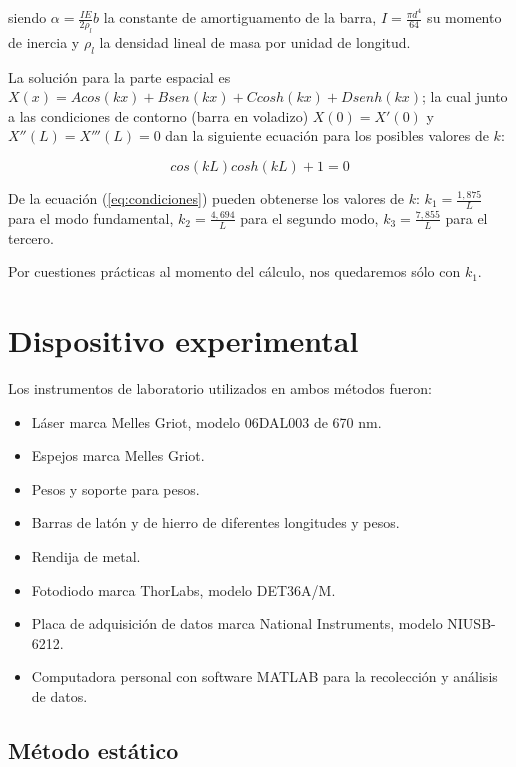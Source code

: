 \documentclass[twoside,twocolumn,a4paper]{article}
\begin{document}
siendo $\alpha = \frac{IE}{2\rho_{l}}b$ la constante de amortiguamento de la barra, $I = \frac{\pi d^4}{64}$ su momento de inercia y $\rho_{l}$ la densidad lineal de masa por unidad de longitud. \newline

La soluci\'on para la parte espacial es $X(x) = Acos(kx) + Bsen(kx) + Ccosh(kx) + Dsenh(kx)$; la cual junto a las condiciones de contorno (barra en voladizo) $X(0) = X'(0)$ y $X''(L) = X'''(L) = 0$ dan la siguiente ecuaci\'on para los posibles valores de $k$:

\begin{equation}
\label{eq:condiciones}
cos(kL)cosh(kL) + 1 = 0
\end{equation}

De la ecuaci\'on (\ref{eq:condiciones}) pueden obtenerse los valores de $k$:  $k_{1} = \frac{1,875}{L}$ para el modo fundamental, $k_{2} = \frac{4,694}{L}$ para el segundo modo, $k_{3} = \frac{7,855}{L}$ para el tercero.

Por cuestiones pr\'acticas al momento del c\'alculo, nos quedaremos s\'olo con $k_{1}$.



\section{Dispositivo experimental}

Los instrumentos de laboratorio utilizados en ambos m\'etodos fueron:
\begin{itemize}
\item 
\label{Laser} L\'aser marca Melles Griot, modelo 06DAL003 de 670 nm.
\item Espejos marca Melles Griot.
\item Pesos y soporte para pesos.
\item Barras de lat\'on y de hierro de diferentes longitudes y pesos.
\item Rendija de metal.
\item Fotodiodo marca ThorLabs, modelo DET36A/M.
\item Placa de adquisici\'on de datos marca National Instruments, modelo NIUSB-6212.
\item Computadora personal con software MATLAB para la recolecci\'on y an\'alisis de datos.
\end{itemize}

\subsection{M\'etodo est\'atico}
\end{document}
